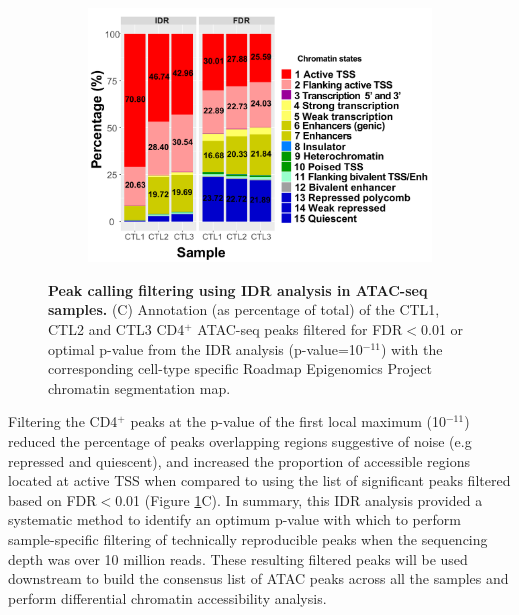 \begin{figure}[htbp]
\begin{subfigure}{0.65\textwidth}
\includegraphics[width=\textwidth]{./Results1/pdfs/stacked_barplot_chromatin_states_percent_CD4_qval_vs_PVAL_IDR_filtered}
\caption{\textbf{}} %
\end{subfigure}%
\caption[Peak calling filtering using IDR analysis in ATAC-seq samples.]{\textbf{Peak calling filtering using IDR analysis in ATAC-seq samples.} (C) Annotation (as percentage of total) of the CTL1, CTL2 and CTL3 CD4$^+$ ATAC-seq peaks filtered for FDR$<$0.01 or optimal p-value from the IDR analysis (p-value=10$^{-11}$) with the corresponding cell-type specific Roadmap Epigenomics Project chromatin segmentation map.}
\label{figure:Peak_calling_IDR_filtering_and_chrom_stated_ATAC}
\end{figure} 


Filtering the CD4$^+$ peaks at the p-value of the first local maximum (10$^{-11}$) reduced the percentage of peaks overlapping regions suggestive of noise (e.g repressed and quiescent), and increased the proportion of accessible regions located at active TSS when compared to using the list of significant peaks filtered based on FDR$<$0.01 (Figure \ref{figure:Peak_calling_IDR_filtering_and_chrom_stated_ATAC}C). In summary, this IDR analysis provided a systematic method to identify an optimum p-value with which to perform sample-specific filtering of technically reproducible peaks when the sequencing depth was over 10 million reads. These resulting filtered peaks will be used downstream to build the consensus list of ATAC peaks across all the samples and perform differential chromatin accessibility analysis. 

